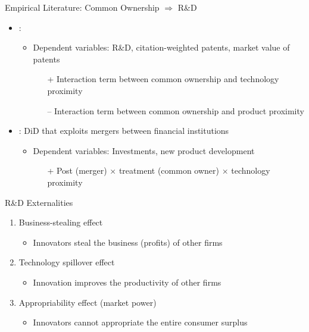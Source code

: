 \documentclass[
  10pt,
  aspectratio=169,   %
]{beamer}
\theoremstyle{plain}
\begin{document}
\begin{frame}{Empirical Literature: Common Ownership $\Longrightarrow$ R\&D}
  \begin{itemize}
    \item \cite{Anton2024-pw}:
          \begin{itemize}
            \item Dependent variables: R\&D, citation-weighted patents, market value of patents
                  \begin{itemize}
                    \item[+] Interaction term between common ownership and technology proximity
                    \item[--] Interaction term between common ownership and product proximity
                  \end{itemize}
          \end{itemize} \medskip{}
    \item \cite{Kini2024-kd}: DiD that exploits mergers between financial institutions
          \begin{itemize}
            \item Dependent variables: Investments, new product development
                  \begin{itemize}
                    \item[+] Post (merger) $\times$ treatment (common owner) $\times$ technology proximity
                  \end{itemize}
          \end{itemize}
  \end{itemize}
\end{frame}

\begin{frame}{R\&D Externalities}
  \label{rd_externalities} %
  \begin{enumerate}
    \item Business-stealing effect
          \begin{itemize}
            \item Innovators steal the business (profits) of other firms
          \end{itemize}
          \medskip{}
    \item Technology spillover effect
          \begin{itemize}
            \item Innovation improves the productivity of other firms
          \end{itemize}
          \medskip{}
    \item Appropriability effect (market power)
          \begin{itemize}
            \item Innovators cannot appropriate the entire consumer surplus
          \end{itemize}
  \end{enumerate}
\end{frame}
\end{document}
